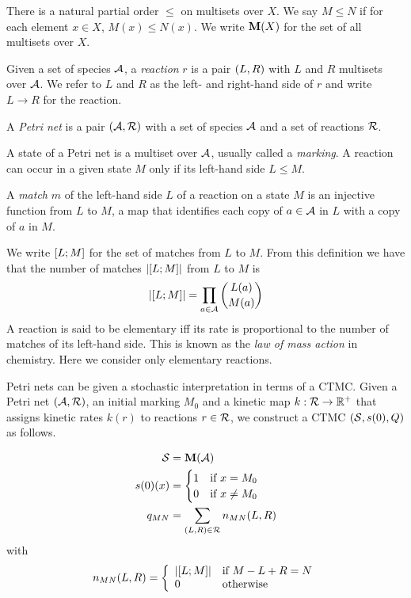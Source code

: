 There is a natural partial order $\leqslant$ on multisets over $X$.
We say $M \leqslant N$ if for each element $x \in X$,
$M(x) \leqslant N(x)$.
We write $\mathbf{M}(X)$ for the set of all multisets over $X$.


\begin{definition}
  Given a set of species $\mathcal{A}$,
  a \emph{reaction} $r$ is a pair $\left(L,R\right)$
  with $L$ and $R$ multisets over $\mathcal{A}$.
  We refer to $L$ and $R$ as the left- and right-hand side of $r$
  and write $L \to R$ for the reaction.
\end{definition}

\begin{definition}%
  A \emph{Petri net} is a pair $\left(\mathcal{A}, \mathcal{R}\right)$ with
  a set of species $\mathcal{A}$ and a set of reactions $\mathcal{R}$.
\end{definition}

A state of a Petri net is a multiset over $\mathcal{A}$,
usually called a \emph{marking}.
A reaction can occur in a given state $M$ only if
its left-hand side $L \leqslant M$.

\begin{definition}
  A \emph{match} $m$ of the left-hand side $L$ of a reaction
  on a state $M$ is an injective function from $L$ to $M$,
  \ie a map that identifies each copy of $a \in \mathcal{A}$ in $L$
  with a copy of $a$ in $M$.
\end{definition}

We write $\left[L;M\right]$ for the set of matches from $L$ to $M$.
From this definition we have that the number of matches
$\left\lvert \left[L;M\right] \right\rvert$ from $L$ to $M$ is
\[ \left\lvert \left[L;M\right] \right\rvert = \prod_{a \in \mathcal{A}} \binom{L(a)}{M(a)} \]
A reaction is said to be elementary iff its rate is
proportional to the number of matches of its left-hand side.
This is known as the \emph{law of mass action} in chemistry.
Here we consider only elementary reactions.

Petri nets can be given a stochastic interpretation
in terms of a CTMC.
Given a Petri net $\left(\mathcal{A}, \mathcal{R}\right)$,
an initial marking $M_0$ and
a kinetic map $k: \mathcal{R} \to \mathbb{R}^+$ that assigns
kinetic rates $k(r)$ to reactions $r \in \mathcal{R}$,
we construct a CTMC $\left(\mathcal{S}, s(0), Q\right)$ as follows.

\begin{align*}
  \mathcal{S} &{} = \mathbf{M}(\mathcal{A}) \\
  s(0)(x) &{} = \begin{cases}
    1 \quad\text{if } x = M_0 \\
    0 \quad\text{if } x \neq M_0
  \end{cases} \\
  q_{MN} &{} = \sum_{\left(L,R\right) \in \mathcal{R}} n_{MN}(L,R)
\end{align*}
with
\begin{equation*}
  n_{MN}(L,R) = \left\{\begin{array}{ll}
    \left\lvert \left[L;M\right] \right\rvert & \text{if } M - L + R = N \\
    0 & \text{otherwise}
  \end{array}\right.
\end{equation*}

